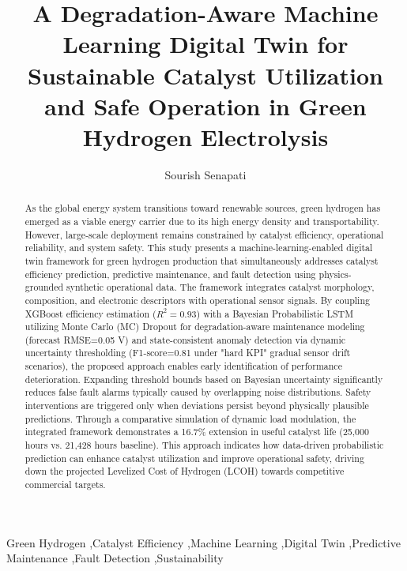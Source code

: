 \documentclass[preprint,12pt]{elsarticle}
\begin{document}
\begin{frontmatter}

\title{A Degradation-Aware Machine Learning Digital Twin for Sustainable Catalyst Utilization and Safe Operation in Green Hydrogen Electrolysis}

\author[1]{Sourish Senapati}
\address[1]{Department of Chemical Engineering, Jadavpur University, Kolkata, India}


\begin{abstract}
As the global energy system transitions toward renewable sources, green hydrogen has emerged as a viable energy carrier due to its high energy density and transportability. However, large-scale deployment remains constrained by catalyst efficiency, operational reliability, and system safety. This study presents a machine-learning-enabled digital twin framework for green hydrogen production that simultaneously addresses catalyst efficiency prediction, predictive maintenance, and fault detection using physics-grounded synthetic operational data. The framework integrates catalyst morphology, composition, and electronic descriptors with operational sensor signals. By coupling XGBoost efficiency estimation ($R^2=0.93$) with a Bayesian Probabilistic LSTM utilizing Monte Carlo (MC) Dropout for degradation-aware maintenance modeling (forecast RMSE=0.05 V) and state-consistent anomaly detection via dynamic uncertainty thresholding (F1-score=0.81 under "hard KPI" gradual sensor drift scenarios), the proposed approach enables early identification of performance deterioration. Expanding threshold bounds based on Bayesian uncertainty significantly reduces false fault alarms typically caused by overlapping noise distributions. Safety interventions are triggered only when deviations persist beyond physically plausible predictions. Through a comparative simulation of dynamic load modulation, the integrated framework demonstrates a 16.7\% extension in useful catalyst life (25,000 hours vs. 21,428 hours baseline). This approach indicates how data-driven probabilistic prediction can enhance catalyst utilization and improve operational safety, driving down the projected Levelized Cost of Hydrogen (LCOH) towards competitive commercial targets.
\end{abstract}

\begin{keyword}
Green Hydrogen \sep Catalyst Efficiency \sep Machine Learning \sep Digital Twin \sep Predictive Maintenance \sep Fault Detection \sep Sustainability
\end{keyword}

\end{frontmatter}
\end{document}
